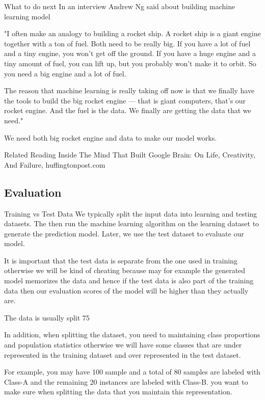 What to do next
In an interview Andrew Ng said about building machine learning model

"I often make an analogy to building a rocket ship. A rocket ship is a giant engine together with a ton of fuel. Both need to be really big. If you have a lot of fuel and a tiny engine, you won’t get off the ground. If you have a huge engine and a tiny amount of fuel, you can lift up, but you probably won’t make it to orbit. So you need a big engine and a lot of fuel.

The reason that machine learning is really taking off now is that we finally have the tools to build the big rocket engine — that is giant computers, that’s our rocket engine. And the fuel is the data. We finally are getting the data that we need."

We need both big rocket engine and data to make our model works.

Related Reading
Inside The Mind That Built Google Brain: On Life, Creativity, And Failure, huffingtonpost.com

\subsection{Evaluation}

Training vs Test Data
We typically split the input data into learning and testing datasets. The then run the machine learning algorithm on the learning dataset to generate the prediction model. Later, we use the test dataset to evaluate our model.



It is important that the test data is separate from the one used in training otherwise we will be kind of cheating because may for example the generated model memorizes the data and hence if the test data is also part of the training data then our evaluation scores of the model will be higher than they actually are.

The data is usually split 75%

In addition, when splitting the dataset, you need to maintaining class proportions and population statistics otherwise we will have some classes that are under represented in the training dataset and over represented in the test dataset.

For example, you may have 100 sample and a total of 80 samples are labeled with Class-A and the remaining 20 instances are labeled with Class-B. you want to make sure when splitting the data that you maintain this representation.

